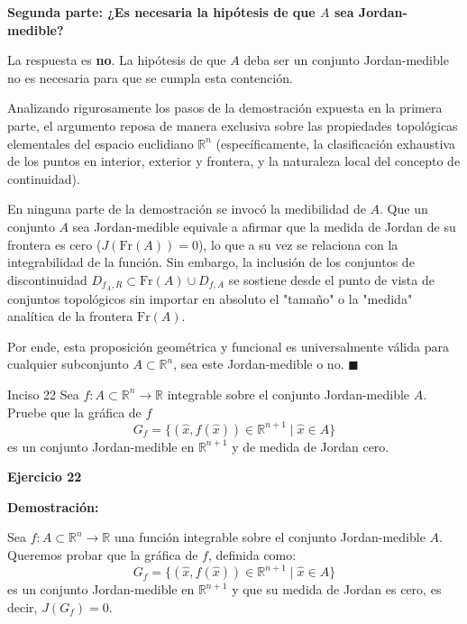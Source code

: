\documentclass[11pt,letterpaper]{article}
\begin{document}
\vspace{0.5cm}
\textbf{Segunda parte: ¿Es necesaria la hipótesis de que $A$ sea Jordan-medible?}

La respuesta es \textbf{no}. La hipótesis de que $A$ deba ser un conjunto Jordan-medible no es necesaria para que se cumpla esta contención.

Analizando rigurosamente los pasos de la demostración expuesta en la primera parte, el argumento reposa de manera exclusiva sobre las propiedades topológicas elementales del espacio euclidiano $\mathbb{R}^n$ (específicamente, la clasificación exhaustiva de los puntos en interior, exterior y frontera, y la naturaleza local del concepto de continuidad). 

En ninguna parte de la demostración se invocó la medibilidad de $A$. Que un conjunto $A$ sea Jordan-medible equivale a afirmar que la medida de Jordan de su frontera es cero ($J(\text{Fr}(A)) = 0$), lo que a su vez se relaciona con la integrabilidad de la función. Sin embargo, la inclusión de los conjuntos de discontinuidad $D_{f_A, R} \subset \text{Fr}(A) \cup D_{f, A}$ se sostiene desde el punto de vista de conjuntos topológicos sin importar en absoluto el "tamaño" o la "medida" analítica de la frontera $\text{Fr}(A)$. 

Por ende, esta proposición geométrica y funcional es universalmente válida para cualquier subconjunto $A \subset \mathbb{R}^n$, sea este Jordan-medible o no. \hfill $\blacksquare$

\begin{inciso}{Inciso 22}
Sea $f:A\subset\mathbb{R}^{n}\rightarrow\mathbb{R}$ integrable sobre el conjunto Jordan-medible $A$. Pruebe que la gráfica de $f$
\begin{equation*}
    G_{f}=\{(\hat{x},f(\hat{x}))\in\mathbb{R}^{n+1}\mid\hat{x}\in A\}
\end{equation*}
es un conjunto Jordan-medible en $\mathbb{R}^{n+1}$ y de medida de Jordan cero.
\end{inciso}

\textbf{Ejercicio 22}

\textbf{Demostración:}

Sea $f: A \subset \mathbb{R}^n \rightarrow \mathbb{R}$ una función integrable sobre el conjunto Jordan-medible $A$. Queremos probar que la gráfica de $f$, definida como:
\begin{equation*}
G_f = \{(\hat{x}, f(\hat{x})) \in \mathbb{R}^{n+1} \mid \hat{x} \in A\}
\end{equation*}
es un conjunto Jordan-medible en $\mathbb{R}^{n+1}$ y que su medida de Jordan es cero, es decir, $J(G_f) = 0$.
\end{document}
